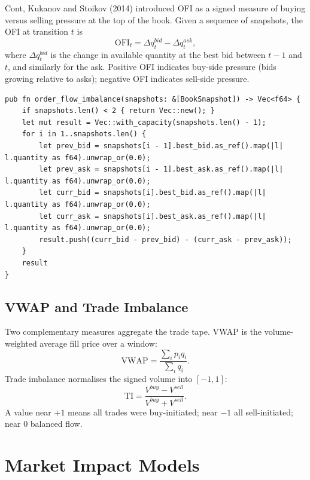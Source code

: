 Cont, Kukanov and Stoikov (2014) introduced OFI as a signed measure of
buying versus selling pressure at the top of the book. Given a sequence
of snapshots, the OFI at transition $t$ is
\[
    \mathrm{OFI}_t = \Delta q^{bid}_t - \Delta q^{ask}_t,
\]
where $\Delta q^{bid}_t$ is the change in available quantity at the
best bid between $t-1$ and $t$, and similarly for the ask. Positive
OFI indicates buy-side pressure (bids growing relative to asks);
negative OFI indicates sell-side pressure.

\begin{lstlisting}[caption={Order flow imbalance from book snapshots}]
pub fn order_flow_imbalance(snapshots: &[BookSnapshot]) -> Vec<f64> {
    if snapshots.len() < 2 { return Vec::new(); }
    let mut result = Vec::with_capacity(snapshots.len() - 1);
    for i in 1..snapshots.len() {
        let prev_bid = snapshots[i - 1].best_bid.as_ref().map(|l| l.quantity as f64).unwrap_or(0.0);
        let prev_ask = snapshots[i - 1].best_ask.as_ref().map(|l| l.quantity as f64).unwrap_or(0.0);
        let curr_bid = snapshots[i].best_bid.as_ref().map(|l| l.quantity as f64).unwrap_or(0.0);
        let curr_ask = snapshots[i].best_ask.as_ref().map(|l| l.quantity as f64).unwrap_or(0.0);
        result.push((curr_bid - prev_bid) - (curr_ask - prev_ask));
    }
    result
}
\end{lstlisting}

\subsection{VWAP and Trade Imbalance}

Two complementary measures aggregate the trade tape. VWAP is the
volume-weighted average fill price over a window:
\[
    \mathrm{VWAP} = \frac{\sum_i p_i q_i}{\sum_i q_i}.
\]
Trade imbalance normalises the signed volume into $[-1, 1]$:
\[
    \mathrm{TI} = \frac{V^{buy} - V^{sell}}{V^{buy} + V^{sell}}.
\]
A value near $+1$ means all trades were buy-initiated; near $-1$ all
sell-initiated; near $0$ balanced flow.

\section{Market Impact Models}



